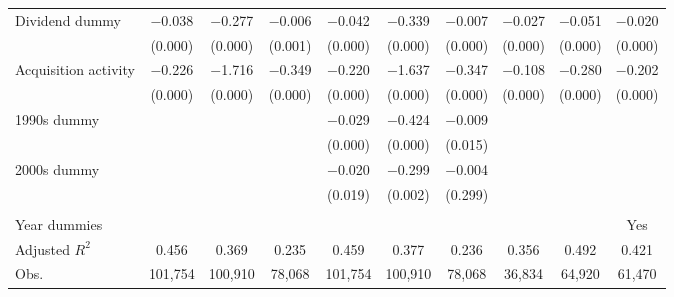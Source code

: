 {\begin{longtable}{l*{9}{c}}
\addlinespace
Dividend dummy      &    $-$0.038&    $-$0.277&    $-$0.006&    $-$0.042&    $-$0.339&    $-$0.007&    $-$0.027&    $-$0.051&    $-$0.020\\
                    &     (0.000)&     (0.000)&     (0.001)&     (0.000)&     (0.000)&     (0.000)&     (0.000)&     (0.000)&     (0.000)\\
\addlinespace
Acquisition activity&    $-$0.226&    $-$1.716&    $-$0.349&    $-$0.220&    $-$1.637&    $-$0.347&    $-$0.108&    $-$0.280&    $-$0.202\\
                    &     (0.000)&     (0.000)&     (0.000)&     (0.000)&     (0.000)&     (0.000)&     (0.000)&     (0.000)&     (0.000)\\
\addlinespace
1990s dummy         &            &            &            &    $-$0.029&    $-$0.424&    $-$0.009&            &            &            \\
                    &            &            &            &     (0.000)&     (0.000)&     (0.015)&            &            &            \\
\addlinespace
2000s dummy         &            &            &            &    $-$0.020&    $-$0.299&    $-$0.004&            &            &            \\
                    &            &            &            &     (0.019)&     (0.002)&     (0.299)&            &            &            \\
\\
Year dummies        &            &            &            &            &            &            &            &            &         Yes\\
Adjusted $ R^2$     &       0.456&       0.369&       0.235&       0.459&       0.377&       0.236&       0.356&       0.492&       0.421\\
Obs.                &     101,754&     100,910&      78,068&     101,754&     100,910&      78,068&      36,834&      64,920&      61,470\\
\bottomrule
\end{longtable}
}
